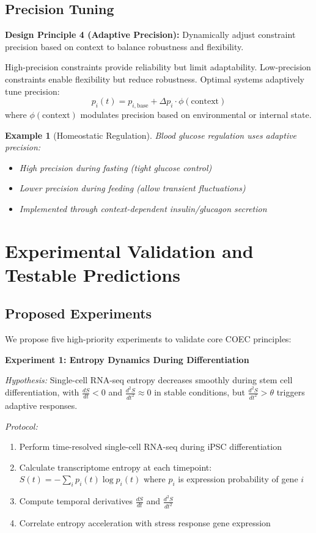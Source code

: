 \documentclass[11pt]{article}
\newtheorem{example}{Example}
\begin{document}
\subsection{Precision Tuning}

\textbf{Design Principle 4 (Adaptive Precision):} Dynamically adjust constraint precision based on context to balance robustness and flexibility.

High-precision constraints provide reliability but limit adaptability. Low-precision constraints enable flexibility but reduce robustness. Optimal systems adaptively tune precision:
\begin{equation}
p_i(t) = p_{i,\text{base}} + \Delta p_i \cdot \phi(\text{context})
\end{equation}
where $\phi(\text{context})$ modulates precision based on environmental or internal state.

\begin{example}[Homeostatic Regulation]
Blood glucose regulation uses adaptive precision:
\begin{itemize}
\item High precision during fasting (tight glucose control)
\item Lower precision during feeding (allow transient fluctuations)
\item Implemented through context-dependent insulin/glucagon secretion
\end{itemize}
\end{example}

\section{Experimental Validation and Testable Predictions}
\label{sec:validation}

\subsection{Proposed Experiments}

We propose five high-priority experiments to validate core COEC principles:

\textbf{Experiment 1: Entropy Dynamics During Differentiation}

\textit{Hypothesis:} Single-cell RNA-seq entropy decreases smoothly during stem cell differentiation, with $\frac{dS}{dt} < 0$ and $\frac{d^2S}{dt^2} \approx 0$ in stable conditions, but $\frac{d^2S}{dt^2} > \theta$ triggers adaptive responses.

\textit{Protocol:}
\begin{enumerate}
\item Perform time-resolved single-cell RNA-seq during iPSC differentiation
\item Calculate transcriptome entropy at each timepoint: $S(t) = -\sum_i p_i(t) \log p_i(t)$ where $p_i$ is expression probability of gene $i$
\item Compute temporal derivatives $\frac{dS}{dt}$ and $\frac{d^2S}{dt^2}$
\item Correlate entropy acceleration with stress response gene expression
\end{enumerate}
\end{document}
